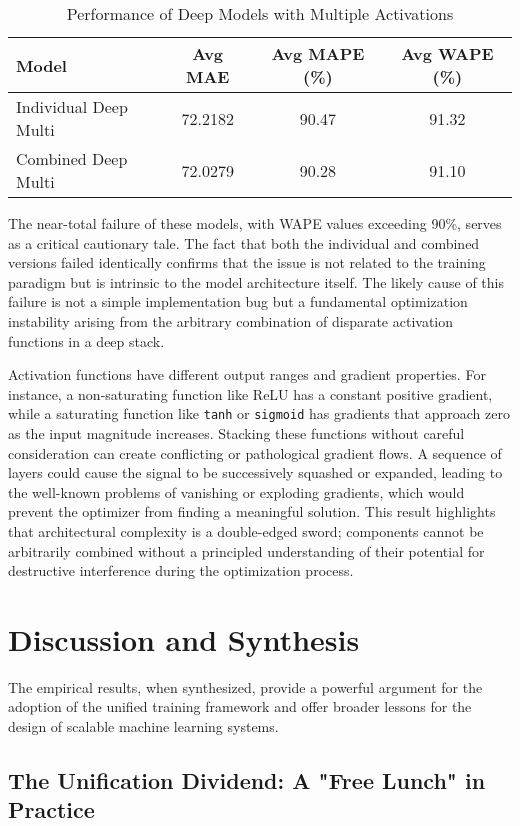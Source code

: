 \documentclass{article}
\begin{document}
\begin{table}[h!]
\centering
\caption{Performance of Deep Models with Multiple Activations}
\begin{tabular}{@{}lccc@{}}
\toprule
Model & Avg MAE & Avg MAPE (\%) & Avg WAPE (\%) \\
\midrule
Individual Deep Multi & 72.2182 & 90.47 & 91.32 \\
Combined Deep Multi & 72.0279 & 90.28 & 91.10 \\
\bottomrule
\end{tabular}
\label{tab:anomaly}
\end{table}

The near-total failure of these models, with WAPE values exceeding 90\%, serves as a critical cautionary tale. The fact that both the individual and combined versions failed identically confirms that the issue is not related to the training paradigm but is intrinsic to the model architecture itself. The likely cause of this failure is not a simple implementation bug but a fundamental optimization instability arising from the arbitrary combination of disparate activation functions in a deep stack.

Activation functions have different output ranges and gradient properties. For instance, a non-saturating function like ReLU has a constant positive gradient, while a saturating function like \texttt{tanh} or \texttt{sigmoid} has gradients that approach zero as the input magnitude increases. Stacking these functions without careful consideration can create conflicting or pathological gradient flows. A sequence of layers could cause the signal to be successively squashed or expanded, leading to the well-known problems of vanishing or exploding gradients, which would prevent the optimizer from finding a meaningful solution. This result highlights that architectural complexity is a double-edged sword; components cannot be arbitrarily combined without a principled understanding of their potential for destructive interference during the optimization process.

\section{Discussion and Synthesis}

The empirical results, when synthesized, provide a powerful argument for the adoption of the unified training framework and offer broader lessons for the design of scalable machine learning systems.

\subsection{The Unification Dividend: A "Free Lunch" in Practice}
\end{document}
